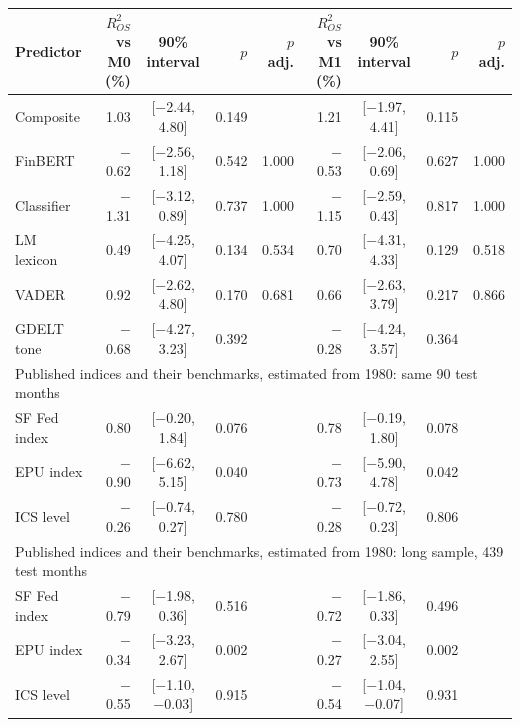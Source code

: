 \begin{tabular}{lrcrrrcrr}
\toprule
Predictor & $R^2_{OS}$ vs M0 (\%) & 90\% interval & $p$ & $p$ adj. & $R^2_{OS}$ vs M1 (\%) & 90\% interval & $p$ & $p$ adj. \\
\midrule
Composite & 1.03 & [$-$2.44, 4.80] & 0.149 &  & 1.21 & [$-$1.97, 4.41] & 0.115 &  \\
FinBERT & $-$0.62 & [$-$2.56, 1.18] & 0.542 & 1.000 & $-$0.53 & [$-$2.06, 0.69] & 0.627 & 1.000 \\
Classifier & $-$1.31 & [$-$3.12, 0.89] & 0.737 & 1.000 & $-$1.15 & [$-$2.59, 0.43] & 0.817 & 1.000 \\
LM lexicon & 0.49 & [$-$4.25, 4.07] & 0.134 & 0.534 & 0.70 & [$-$4.31, 4.33] & 0.129 & 0.518 \\
VADER & 0.92 & [$-$2.62, 4.80] & 0.170 & 0.681 & 0.66 & [$-$2.63, 3.79] & 0.217 & 0.866 \\
GDELT tone & $-$0.68 & [$-$4.27, 3.23] & 0.392 &  & $-$0.28 & [$-$4.24, 3.57] & 0.364 &  \\
\midrule
\multicolumn{9}{l}{Published indices and their benchmarks, estimated from 1980: same 90 test months} \\
SF Fed index & 0.80 & [$-$0.20, 1.84] & 0.076 &  & 0.78 & [$-$0.19, 1.80] & 0.078 &  \\
EPU index & $-$0.90 & [$-$6.62, 5.15] & 0.040 &  & $-$0.73 & [$-$5.90, 4.78] & 0.042 &  \\
ICS level & $-$0.26 & [$-$0.74, 0.27] & 0.780 &  & $-$0.28 & [$-$0.72, 0.23] & 0.806 &  \\
\midrule
\multicolumn{9}{l}{Published indices and their benchmarks, estimated from 1980: long sample, 439 test months} \\
SF Fed index & $-$0.79 & [$-$1.98, 0.36] & 0.516 &  & $-$0.72 & [$-$1.86, 0.33] & 0.496 &  \\
EPU index & $-$0.34 & [$-$3.23, 2.67] & 0.002 &  & $-$0.27 & [$-$3.04, 2.55] & 0.002 &  \\
ICS level & $-$0.55 & [$-$1.10, $-$0.03] & 0.915 &  & $-$0.54 & [$-$1.04, $-$0.07] & 0.931 &  \\
\bottomrule
\end{tabular}

